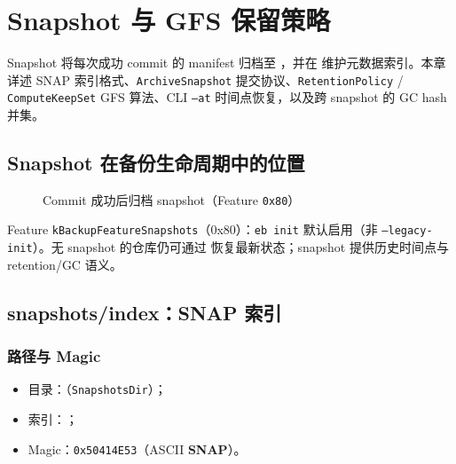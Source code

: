 \chapter{Snapshot 与 GFS 保留策略}
\label{ch:snapshot-retention}

Snapshot 将每次成功 commit 的 manifest 归档至 ，并在  维护元数据索引。本章详述 SNAP 索引格式、\texttt{ArchiveSnapshot} 提交协议、\texttt{RetentionPolicy} / \texttt{ComputeKeepSet} GFS 算法、CLI \texttt{--at} 时间点恢复，以及跨 snapshot 的 GC hash 并集。

\section{Snapshot 在备份生命周期中的位置}

\begin{figure}[htbp]
\centering
{}
\caption{Commit 成功后归档 snapshot（Feature \texttt{0x80}）}
\label{fig:snapshot-commit}
\end{figure}

Feature \texttt{kBackupFeatureSnapshots}（0x80）：\texttt{eb init} 默认启用（非 \texttt{--legacy-init}）。无 snapshot 的仓库仍可通过  恢复最新状态；snapshot 提供历史时间点与 retention/GC 语义。

\section{snapshots/index：SNAP 索引}

\subsection{路径与 Magic}

\begin{itemize}[nosep]
  \item 目录：（\texttt{SnapshotsDir}）；
  \item 索引：；
  \item Magic：\texttt{0x50414E53}（ASCII \textbf{SNAP}）。
\end{itemize}

